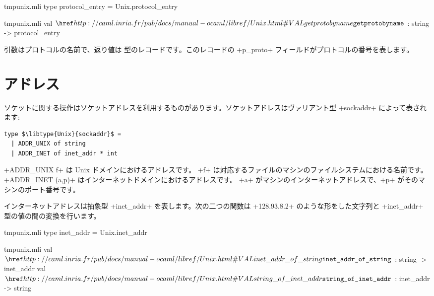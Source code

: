 %
\begin{codefile}{tmpunix.mli}
type protocol_entry = Unix.protocol_entry
\end{codefile}
%
\begin{listingcodefile}{tmpunix.mli}
val $\libvalue{Unix}{getprotobyname}$ : string -> protocol_entry
\end{listingcodefile}
%
引数はプロトコルの名前で、返り値は  型のレコードです。このレコードの \ml+p_proto+ フィールドがプロトコルの番号を表します。

\section{アドレス}

ソケットに関する操作はソケットアドレスを利用するものがあります。ソケットアドレスはヴァリアント型 \ml+sockaddr+ によって表されます:
\begin{lstlisting}
type $\libtype{Unix}{sockaddr}$ =
  | ADDR_UNIX of string
  | ADDR_INET of inet_addr * int
\end{lstlisting}
\ml+ADDR_UNIX f+ は Unix ドメインにおけるアドレスです。 \ml+f+ は対応するファイルのマシンのファイルシステムにおける名前です。 \ml+ADDR_INET (a,p)+ はインターネットドメインにおけるアドレスです。 \ml+a+ がマシンのインターネットアドレスで、\ml+p+ がそのマシンのポート番号です。

インターネットアドレスは抽象型 \ml+inet_addr+ を表します。次の二つの関数は \ml+128.93.8.2+ のような形をした文字列と \ml+inet_addr+ 型の値の間の変換を行います。
%
\begin{codefile}{tmpunix.mli}
type inet_addr = Unix.inet_addr
\end{codefile}
%
\begin{listingcodefile}{tmpunix.mli}
val $\indexlibvalue{Unix}{inet\_addr\_of\_string}$ : string -> inet_addr
val $\indexlibvalue{Unix}{string\_of\_inet\_addr}$ : inet_addr -> string
\end{listingcodefile}
%


